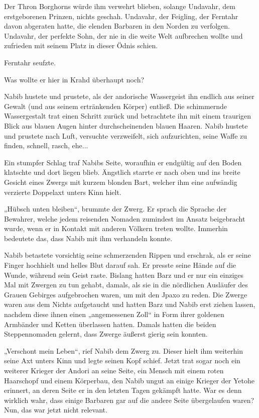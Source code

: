 Der Thron Borghorns würde ihm verwehrt blieben, solange Undavahr, dem erstgeborenen Prinzen, nichts geschah. Undavahr, der Feigling, der Ferntahr davon abgeraten hatte, die elenden Barbaren in den Norden zu verfolgen. Undavahr, der perfekte Sohn, der nie in die weite Welt aufbrechen wollte und zufrieden mit seinem Platz in dieser Ödnis schien.

Ferntahr seufzte.

Was wollte er hier in Krahd überhaupt noch?\bigskip



Nabib hustete und prustete, als der andorische Wassergeist ihn endlich aus seiner Gewalt (und aus seinem ertränkenden Körper) entließ. Die schimmernde Wassergestalt trat einen Schritt zurück und betrachtete ihn mit einem traurigen Blick aus blauen Augen hinter durchscheinenden blauen Haaren. Nabib hustete und prustete nach Luft, versuchte verzweifelt, sich aufzurichten, seine Waffe zu finden, schnell, rasch, ehe...

Ein stumpfer Schlag traf Nabibs Seite, woraufhin er endgültig auf den Boden klatschte und dort liegen blieb. Ängstlich starrte er nach oben und ins breite Gesicht eines Zwergs mit kurzem blonden Bart, welcher ihm eine aufwändig verzierte Doppelaxt unters Kinn hielt.

„Hübsch unten bleiben“, brummte der Zwerg. Er sprach die Sprache der Bewahrer, welche jedem reisenden Nomaden zumindest im Ansatz beigebracht wurde, wenn er in Kontakt mit anderen Völkern treten wollte. Immerhin bedeutete das, dass Nabib mit ihm verhandeln konnte.

Nabib betastete vorsichtig seine schmerzenden Rippen und erschrak, als er seine Finger hochhielt und helles Blut darauf sah. Er presste seine Hände auf die Wunde, während sein Geist raste. Bislang hatten Barz und er nur ein einziges Mal mit Zwergen zu tun gehabt, damals, als sie in die nördlichen Ausläufer des Grauen Gebirges aufgebrochen waren, um mit den Jpaxo zu reden. Die Zwerge waren aus dem Nichts aufgetaucht und hatten Barz und Nabib erst ziehen lassen, nachdem diese ihnen einen „angemessenen Zoll“ in Form ihrer goldenen Armbänder und Ketten überlassen hatten. Damals hatten die beiden Steppennomaden gelernt, dass Zwerge äußerst gierig sein konnten.

„Verschont mein Leben“, rief Nabib dem Zwerg zu. Dieser hielt ihm weiterhin seine Axt unters Kinn und legte seinen Kopf schief. Jetzt trat sogar noch ein weiterer Krieger der Andori an seine Seite, ein Mensch mit einem roten Haarschopf und einem Körperbau, den Nabib ungut an einige Krieger der Yetohe erinnert, an deren Seite er in den letzten Tagen gekämpft hatte. War es denn wirklich wahr, dass einige Barbaren gar auf die andere Seite übergelaufen waren? Nun, das war jetzt nicht relevant.

